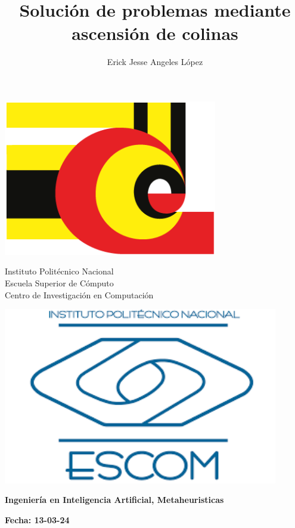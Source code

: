 \documentclass[12pt,twoside]{article}
\title{Solución de problemas mediante ascensión de colinas}
\author{Erick Jesse Angeles López}
\date{}
\begin{document}
	
	\begin{center}
		
		\begin{minipage}{0.17\textwidth}
			\centering
			\includegraphics[width=0.7\textwidth]{img/cic_logo.png} %
		\end{minipage}
		\begin{minipage}{.55\textwidth}
			\centering
			{\Large Instituto Politécnico Nacional}\\
			{\Large Escuela Superior de Cómputo}\\
			{\Large Centro de Investigación en Computación}
		\end{minipage}
		\begin{minipage}{0.17\textwidth}
			\centering
			\includegraphics[width=0.9\textwidth]{img/escom_logo} %
		\end{minipage}			
	\end{center}
	
	
	\centerline{\bf Ingeniería en Inteligencia Artificial, Metaheuristicas}
	
	\centerline{\bf Fecha: 13-03-24}
	
\end{document}
